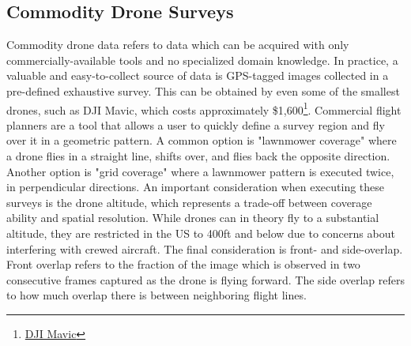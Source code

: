\subsection{Commodity Drone Surveys}
Commodity drone data refers to data which can be acquired with only commercially-available tools and no specialized domain knowledge. In practice, a valuable and easy-to-collect source of data is GPS-tagged images collected in a pre-defined exhaustive survey. This can be obtained by even some of the smallest drones, such as DJI Mavic, which costs approximately \$1,600\footnote{\href{https://store.dji.com/product/dji-mavic-3-classic}{DJI Mavic}}. Commercial flight planners are a tool that allows a user to quickly define a survey region and fly over it in a geometric pattern. A common option is "lawnmower coverage" where a drone flies in a straight line, shifts over, and flies back the opposite direction. Another option is "grid coverage" where a lawnmower pattern is executed twice, in perpendicular directions. An important consideration when executing these surveys is the drone altitude, which represents a trade-off between coverage ability and spatial resolution. While drones can in theory fly to a substantial altitude, they are restricted in the US to 400ft and below due to concerns about interfering with crewed aircraft. The final consideration is front- and side-overlap. Front overlap refers to the fraction of the image which is observed in two consecutive frames captured as the drone is flying forward. The side overlap refers to how much overlap there is between neighboring flight lines.
